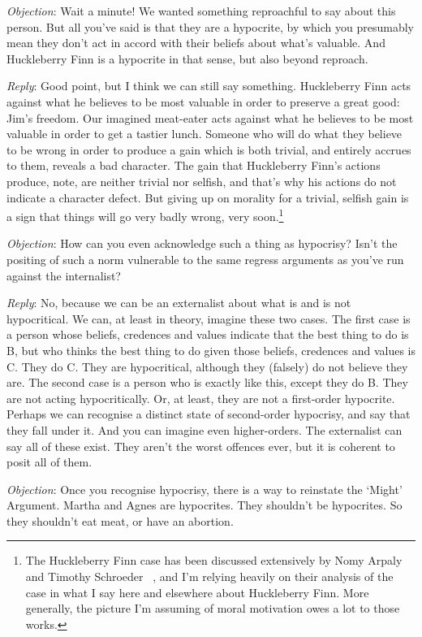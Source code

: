 \emph{Objection}: Wait a minute! We wanted something reproachful to say about this person. But all you've said is that they are a hypocrite, by which you presumably mean they don't act in accord with their beliefs about what's valuable. And Huckleberry Finn is a hypocrite in that sense, but also beyond reproach.

\emph{Reply}: Good point, but I think we can still say something. Huckleberry Finn acts against what he believes to be most valuable in order to preserve a great good: Jim's freedom. Our imagined meat-eater acts against what he believes to be most valuable in order to get a tastier lunch. Someone who will do what they believe to be wrong in order to produce a gain which is both trivial, and entirely accrues to them, reveals a bad character. The gain that Huckleberry Finn's actions produce, note, are neither trivial nor selfish, and that's why his actions do not indicate a character defect. But giving up on morality for a trivial, selfish gain is a sign that things will go very badly wrong, very soon.\footnote{The Huckleberry Finn case has been discussed extensively by Nomy Arpaly and Timothy Schroeder ~\citep{Arpaly2002, Arpaly2003, ArpalySchroeder1999, ArpalySchroeder2014}, and I'm relying heavily on their analysis of the case in what I say here and elsewhere about Huckleberry Finn. More generally, the picture I'm assuming of moral motivation owes a lot to those works.}

\emph{Objection}: How can you even acknowledge such a thing as hypocrisy? Isn't the positing of such a norm vulnerable to the same regress arguments as you've run against the internalist?

\emph{Reply}: No, because we can be an externalist about what is and is not hypocritical. We can, at least in theory, imagine these two cases. The first case is a person whose beliefs, credences and values indicate that the best thing to do is B, but who thinks the best thing to do given those beliefs, credences and values is C. They do C. They are hypocritical, although they (falsely) do not believe they are. The second case is a person who is exactly like this, except they do B. They are not acting hypocritically. Or, at least, they are not a first-order hypocrite. Perhaps we can recognise a distinct state of second-order hypocrisy, and say that they fall under it. And you can imagine even higher-orders. The externalist can say all of these exist. They aren't the worst offences ever, but it is coherent to posit all of them.

\emph{Objection}: Once you recognise hypocrisy, there is a way to reinstate the `Might' Argument. Martha and Agnes are hypocrites. They shouldn't be hypocrites. So they shouldn't eat meat, or have an abortion.

